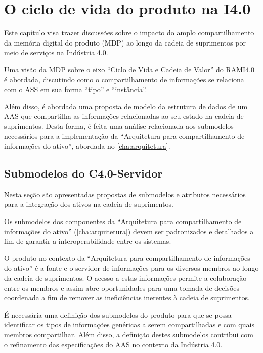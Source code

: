 \chapter{O ciclo de vida do produto na I4.0}
\label{cha:ciclo-de-vida}

Este capítulo visa trazer discussões sobre o impacto do amplo compartilhamento da memória digital do produto (MDP) ao longo da cadeia de suprimentos por meio de serviços na Indústria 4.0.


Uma visão da MDP sobre o eixo ``Ciclo de Vida e Cadeia de Valor'' do RAMI4.0 é abordada, discutindo como o compartilhamento de informações se relaciona com o ASS em sua forma ``tipo'' e ``instância''.

Além disso, é abordada uma proposta de modelo da estrutura de dados de um AAS que compartilha as informações relacionadas ao seu estado na cadeia de suprimentos. Desta forma, é feita uma análise relacionada aos submodelos necessários para a implementação da ``Arquitetura para compartilhamento de informações do ativo'', abordada no \autoref{cha:arquitetura}.

\section{Submodelos do C4.0-Servidor}

Nesta seção são apresentadas propostas de submodelos e atributos necessários para a integração dos ativos na cadeia de suprimentos.

Os submodelos dos componentes da ``Arquitetura para compartilhamento de informações do ativo'' (\autoref{cha:arquitetura}) devem ser padronizados e detalhados a fim de garantir a interoperabilidade entre os sistemas.

O produto no contexto da ``Arquitetura para compartilhamento de informações do ativo'' é a fonte e o servidor de informações para os diversos membros ao longo da cadeia de suprimentos. O acesso a estas informações permite a colaboração entre os membros e assim abre oportunidades para uma tomada de decisões coordenada a fim de remover as ineficiências inerentes à cadeia de suprimentos.

É necessária uma definição dos submodelos do produto para que se possa identificar os tipos de informações genéricas a serem compartilhadas e com quais membros compartilhar. Além disso, a definição destes submodelos contribui com o refinamento das especificações do AAS no contexto da Indústria 4.0.

